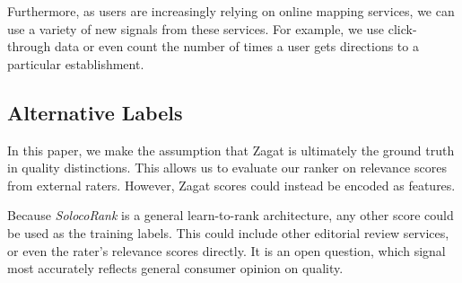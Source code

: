 Furthermore, as users are increasingly relying on online mapping services,
we can use a variety of new signals from these services.
For example, we use click-through data or even count the number of times
a user gets directions to a particular establishment.

\subsection{Alternative Labels}
In this paper, we make the assumption that Zagat is ultimately the ground truth
in quality distinctions.
This allows us to evaluate our ranker on relevance scores from external raters.
However, Zagat scores could instead be encoded as features.

Because \emph{SolocoRank} is a general learn-to-rank architecture,
any other score could be used as the training labels.
This could include other editorial review services, or even the rater's
relevance scores directly.
It is an open question, which signal most accurately reflects 
general consumer opinion on quality.

